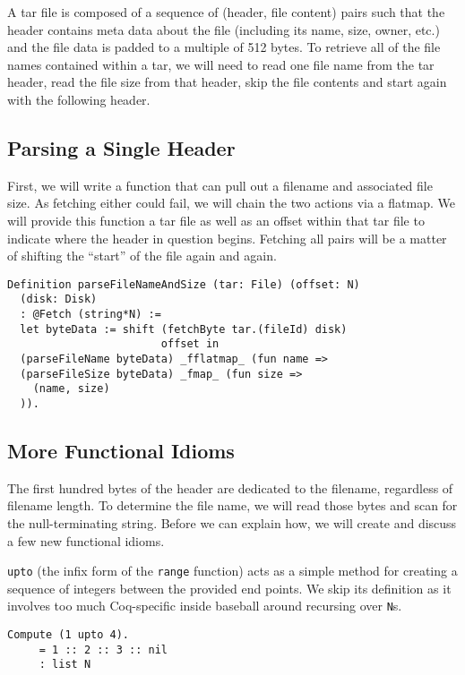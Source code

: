\documentclass[nocopyrightspace]{sigplanconf}
\begin{document}
A tar file is composed of a sequence of (header, file content) pairs such that
the header contains meta data about the file (including its name, size, owner,
etc.) and the file data is padded to a multiple of 512 bytes. To retrieve all
of the file names contained within a tar, we will need to read one file name
from the tar header, read the file size from that header, skip the file
contents and start again with the following header.

\subsection{Parsing a Single Header}

First, we will write a function that can pull out a filename and associated
file size. As fetching either could fail, we will chain the two actions via a
flatmap. We will provide this function a tar file as well as an offset within
that tar file to indicate where the header in question begins. Fetching all
pairs will be a matter of shifting the ``start'' of the file again and again.

\begin{lstlisting}
Definition parseFileNameAndSize (tar: File) (offset: N) 
  (disk: Disk)
  : @Fetch (string*N) :=
  let byteData := shift (fetchByte tar.(fileId) disk) 
                        offset in
  (parseFileName byteData) _fflatmap_ (fun name =>
  (parseFileSize byteData) _fmap_ (fun size =>
    (name, size)
  )).
\end{lstlisting}

\subsection{More Functional Idioms}

The first hundred bytes of the header are dedicated to the filename,
regardless of filename length. To determine the file name, we will read those
bytes and scan for the null-terminating string. Before we can explain how, we
will create and discuss a few new functional idioms.

{\tt upto} (the infix form of the {\tt range} function) acts as a simple
method for creating a sequence of integers between the provided end points. We
skip its definition as it involves too much Coq-specific inside baseball
around recursing over {\tt N}s.

\begin{lstlisting}
Compute (1 upto 4).
     = 1 :: 2 :: 3 :: nil
     : list N
\end{lstlisting}
\end{document}
